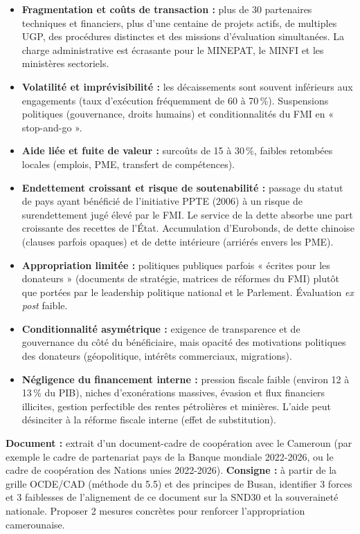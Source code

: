 \documentclass[11pt]{article}
\begin{document}
\begin{itemize}
    \item \textbf{Fragmentation et coûts de transaction :} plus de 30 partenaires techniques et financiers, plus d'une centaine de projets actifs, de multiples UGP, des procédures distinctes et des missions d'évaluation simultanées. La charge administrative est écrasante pour le MINEPAT, le MINFI et les ministères sectoriels.
    \item \textbf{Volatilité et imprévisibilité :} les décaissements sont souvent inférieurs aux engagements (taux d'exécution fréquemment de 60 à 70\,\%). Suspensions politiques (gouvernance, droits humains) et conditionnalités du FMI en « stop-and-go ».
    \item \textbf{Aide liée et fuite de valeur :} surcoûts de 15 à 30\,\%, faibles retombées locales (emplois, PME, transfert de compétences).
    \item \textbf{Endettement croissant et risque de soutenabilité :} passage du statut de pays ayant bénéficié de l'initiative PPTE (2006) à un risque de surendettement jugé élevé par le FMI. Le service de la dette absorbe une part croissante des recettes de l'État. Accumulation d'Eurobonds, de dette chinoise (clauses parfois opaques) et de dette intérieure (arriérés envers les PME).
    \item \textbf{Appropriation limitée :} politiques publiques parfois « écrites pour les donateurs » (documents de stratégie, matrices de réformes du FMI) plutôt que portées par le leadership politique national et le Parlement. Évaluation \emph{ex post} faible.
    \item \textbf{Conditionnalité asymétrique :} exigence de transparence et de gouvernance du côté du bénéficiaire, mais opacité des motivations politiques des donateurs (géopolitique, intérêts commerciaux, migrations).
    \item \textbf{Négligence du financement interne :} pression fiscale faible (environ 12 à 13\,\% du PIB), niches d'exonérations massives, évasion et flux financiers illicites, gestion perfectible des rentes pétrolières et minières. L'aide peut désinciter à la réforme fiscale interne (effet de substitution).
\end{itemize}

\begin{exercice}
\textbf{Document :} extrait d'un document-cadre de coopération avec le Cameroun (par exemple le cadre de partenariat pays de la Banque mondiale 2022-2026, ou le cadre de coopération des Nations unies 2022-2026).
\textbf{Consigne :} à partir de la grille OCDE/CAD (méthode du 5.5) et des principes de Busan, identifier 3 forces et 3 faiblesses de l'alignement de ce document sur la SND30 et la souveraineté nationale. Proposer 2 mesures concrètes pour renforcer l'appropriation camerounaise.
\end{exercice}
\end{document}
